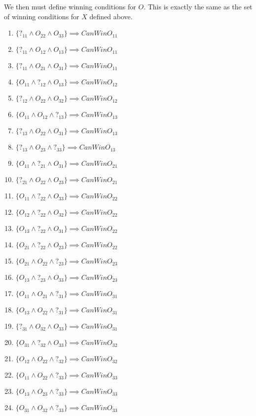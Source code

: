 \documentclass[22pt]{article}
\begin{document}
\noindent We then must define winning conditions for $O$. This is exactly the same 
as the set of winning conditions for $X$ defined above.

\begin{multicols}{2}
\begin{enumerate}
	\item $\{?_{11} \land O_{22} \land O_{33}\} \implies CanWinO_{11}$
	\item $\{?_{11} \land O_{12} \land O_{13}\} \implies CanWinO_{11}$
	\item $\{?_{11} \land O_{21} \land O_{31}\} \implies CanWinO_{11}$

	\item $\{O_{11} \land ?_{12} \land O_{13}\} \implies CanWinO_{12}$
	\item $\{?_{12} \land O_{22} \land O_{32}\} \implies CanWinO_{12}$

	\item $\{O_{11} \land O_{12} \land ?_{13}\} \implies CanWinO_{13}$
	\item $\{?_{13} \land O_{22} \land O_{31}\} \implies CanWinO_{13}$
	\item $\{?_{13} \land O_{23} \land ?_{33}\} \implies CanWinO_{13}$

	\item $\{O_{11} \land ?_{21} \land O_{31}\} \implies CanWinO_{21}$
	\item $\{?_{21} \land O_{22} \land O_{23}\} \implies CanWinO_{21}$

	\item $\{O_{11} \land ?_{22} \land O_{33}\} \implies CanWinO_{22}$
	\item $\{O_{12} \land ?_{22} \land O_{32}\} \implies CanWinO_{22}$
	\item $\{O_{13} \land ?_{22} \land O_{31}\} \implies CanWinO_{22}$
	\item $\{O_{21} \land ?_{22} \land O_{23}\} \implies CanWinO_{22}$

	\item $\{O_{21} \land O_{22} \land ?_{23}\} \implies CanWinO_{23}$
	\item $\{O_{13} \land ?_{23} \land O_{33}\} \implies CanWinO_{23}$

	\item $\{O_{11} \land O_{21} \land ?_{31}\} \implies CanWinO_{31}$
	\item $\{O_{13} \land O_{22} \land ?_{31}\} \implies CanWinO_{31}$
	\item $\{?_{31} \land O_{32} \land O_{33}\} \implies CanWinO_{31}$

	\item $\{O_{31} \land ?_{32} \land O_{33}\} \implies CanWinO_{32}$
	\item $\{O_{12} \land O_{22} \land ?_{32}\} \implies CanWinO_{32}$

	\item $\{O_{11} \land O_{22} \land ?_{33}\} \implies CanWinO_{33}$
	\item $\{O_{13} \land O_{23} \land ?_{33}\} \implies CanWinO_{33}$
	\item $\{O_{31} \land O_{32} \land ?_{33}\} \implies CanWinO_{33}$
\end{enumerate}
\end{multicols}
\end{document}
